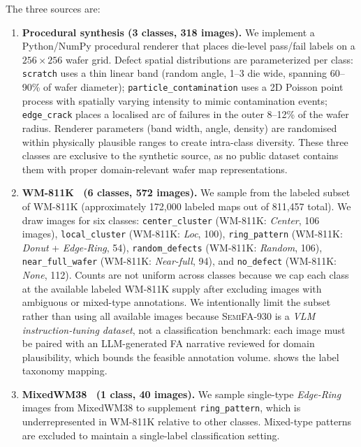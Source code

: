 \documentclass[conference]{IEEEtran}
\newcommand{\semidataset}{\textsc{SemiFA-930}}
\begin{document}
The three sources are:

\begin{enumerate}[leftmargin=*]
    \item \textbf{Procedural synthesis (3 classes, 318 images).}
    We implement a Python/NumPy procedural renderer that places die-level pass/fail labels on a $256 \times 256$ wafer grid.
    Defect spatial distributions are parameterized per class: \texttt{scratch} uses a thin linear band (random angle, 1--3 die wide, spanning 60--90\% of wafer diameter); \texttt{particle\_contamination} uses a 2D Poisson point process with spatially varying intensity to mimic contamination events; \texttt{edge\_crack} places a localised arc of failures in the outer 8--12\% of the wafer radius.
    Renderer parameters (band width, angle, density) are randomised within physically plausible ranges to create intra-class diversity.
    These three classes are exclusive to the synthetic source, as no public dataset contains them with proper domain-relevant wafer map representations.

    \item \textbf{WM-811K~\cite{wu2015wafer} (6 classes, 572 images).}
    We sample from the labeled subset of WM-811K (approximately 172,000 labeled maps out of 811,457 total).
    We draw images for six classes: \texttt{center\_cluster} (WM-811K: \textit{Center}, 106 images), \texttt{local\_cluster} (WM-811K: \textit{Loc}, 100), \texttt{ring\_pattern} (WM-811K: \textit{Donut} + \textit{Edge-Ring}, 54), \texttt{random\_defects} (WM-811K: \textit{Random}, 106), \texttt{near\_full\_wafer} (WM-811K: \textit{Near-full}, 94), and \texttt{no\_defect} (WM-811K: \textit{None}, 112).
    Counts are not uniform across classes because we cap each class at the available labeled WM-811K supply after excluding images with ambiguous or mixed-type annotations.
    We intentionally limit the subset rather than using all available images because \semidataset{} is a \textit{VLM instruction-tuning dataset}, not a classification benchmark: each image must be paired with an LLM-generated FA narrative reviewed for domain plausibility, which bounds the feasible annotation volume.
     shows the label taxonomy mapping.

    \item \textbf{MixedWM38~\cite{wang2020mixedwm38} (1 class, 40 images).}
    We sample single-type \textit{Edge-Ring} images from MixedWM38 to supplement \texttt{ring\_pattern}, which is underrepresented in WM-811K relative to other classes.
    Mixed-type patterns are excluded to maintain a single-label classification setting.
\end{enumerate}
\end{document}
